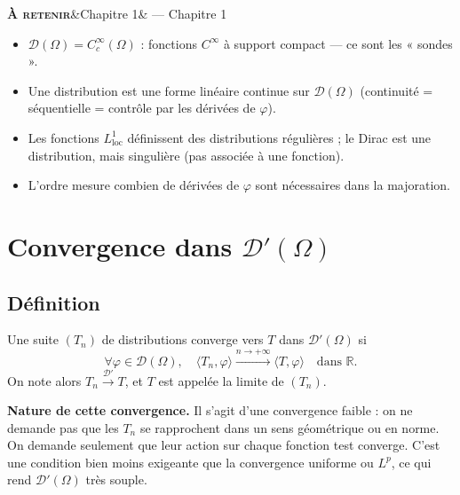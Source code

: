 \documentclass[12pt,a4paper,openany]{book}
\theoremstyle{definition}
\theoremstyle{plain}
\theoremstyle{remark}
\newenvironment{retenir}[1]{%
	\begin{mdframed}[linewidth=3pt, linecolor=black!70,
		topline=false, rightline=false, bottomline=false,
		backgroundcolor=shaderet,
		skipabove=14pt, skipbelow=14pt,
		innerleftmargin=14pt, innerrightmargin=8pt,
		innertopmargin=8pt, innerbottommargin=8pt]%
		\noindent\textbf{\scshape À retenir}\ifx&#1&\else{} — #1\fi\par\smallskip%
	}{%
	\end{mdframed}%
}
\begin{document}
	\begin{retenir}{Chapitre 1}
		\begin{itemize}
			\item $\mathcal{D}(\Omega) = C_c^\infty(\Omega)$ : fonctions $C^\infty$ à support compact — ce sont les « sondes ».
			\item Une distribution est une forme linéaire continue sur $\mathcal{D}(\Omega)$ (continuité = séquentielle = contrôle par les dérivées de $\varphi$).
			\item Les fonctions $L_{\text{loc}}^1$ définissent des distributions régulières ; le Dirac est une distribution, mais singulière (pas associée à une fonction).
			\item L'ordre mesure combien de dérivées de $\varphi$ sont nécessaires dans la majoration.
		\end{itemize}
	\end{retenir}
	
	
	\chapter{Convergence dans $\mathcal{D}'(\Omega)$}
	
	\section{Définition}
	
	\begin{definition}
		Une suite $(T_n)$ de distributions converge vers $T$ dans $\mathcal{D}'(\Omega)$ si
		\[
		\forall \varphi \in \mathcal{D}(\Omega), \quad \langle T_n, \varphi \rangle \xrightarrow{n \to +\infty} \langle T, \varphi \rangle \quad \text{dans } \mathbb{R}.
		\]
		On note alors $T_n \xrightarrow{\mathcal{D}'} T$, et $T$ est appelée la limite de $(T_n)$.
	\end{definition}
	
	\textbf{Nature de cette convergence.} Il s'agit d'une convergence faible : on ne demande pas que les $T_n$ se rapprochent dans un sens géométrique ou en norme. On demande seulement que leur action sur chaque fonction test converge. C'est une condition bien moins exigeante que la convergence uniforme ou $L^p$, ce qui rend $\mathcal{D}'(\Omega)$ très souple.
	
\end{document}

